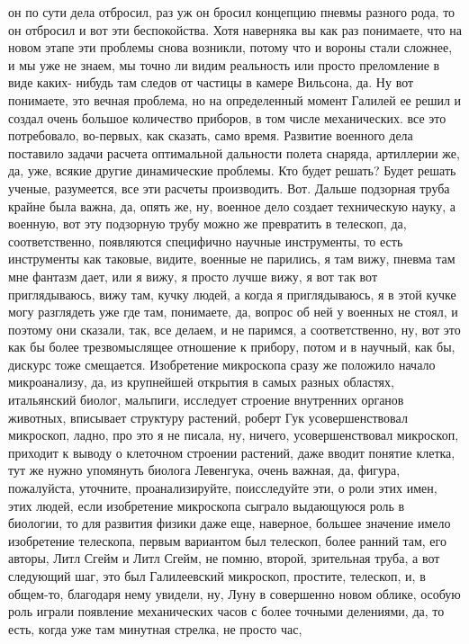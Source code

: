 он по сути дела отбросил, раз уж он бросил концепцию пневмы разного рода, то он
отбросил и вот эти беспокойства. Хотя наверняка вы как раз понимаете, что на
новом этапе эти проблемы снова возникли, потому что и вороны стали сложнее, и мы
уже не знаем, мы точно ли видим реальность или просто преломление в виде каких-
нибудь там следов от частицы в камере Вильсона, да. Ну вот понимаете, это вечная
проблема, но на определенный момент Галилей ее решил и создал очень большое
количество приборов, в том числе механических. все это потребовало, во-первых,
как сказать, само время. Развитие военного дела поставило задачи расчета
оптимальной дальности полета снаряда, артиллерии же, да, уже, всякие другие
динамические проблемы. Кто будет решать? Будет решать ученые, разумеется, все
эти расчеты производить. Вот. Дальше подзорная труба крайне была важна, да,
опять же, ну, военное дело создает техническую науку, а военную, вот эту
подзорную трубу можно же превратить в телескоп, да, соответственно, появляются
специфично научные инструменты, то есть инструменты как таковые, видите, военные
не парились, я там вижу, пневма там мне фантазм дает, или я вижу, я просто лучше
вижу, я вот так вот приглядываюсь, вижу там, кучку людей, а когда я
приглядываюсь, я в этой кучке могу разглядеть уже где там, понимаете, да, вопрос
об ней у военных не стоял, и поэтому они сказали, так, все делаем, и не паримся,
а соответственно, ну, вот это как бы более трезвомыслящее отношение к прибору,
потом и в научный, как бы, дискурс тоже смещается. Изобретение микроскопа сразу
же положило начало микроанализу, да, из крупнейшей открытия в самых разных
областях, итальянский биолог, мальпиги, исследует строение внутренних органов
животных, вписывает структуру растений, роберт Гук усовершенствовал микроскоп,
ладно, про это я не писала, ну, ничего, усовершенствовал микроскоп, приходит к
выводу о клеточном строении растений, даже вводит понятие клетка, тут же нужно
упомянуть биолога Левенгука, очень важная, да, фигура, пожалуйста, уточните,
проанализируйте, поисследуйте эти, о роли этих имен, этих людей, если
изобретение микроскопа сыграло выдающуюся роль в биологии, то для развития
физики даже еще, наверное, большее значение имело изобретение телескопа, первым
вариантом был телескоп, более ранний там, его авторы, Литл Сгейм и Литл Сгейм,
не помню, второй, зрительная труба, а вот следующий шаг, это был Галилеевский
микроскоп, простите, телескоп, и, в общем-то, благодаря нему увидели, ну, Луну в
совершенно новом облике, особую роль играли появление механических часов с более
точными делениями, да, то есть, когда уже там минутная стрелка, не просто час,
